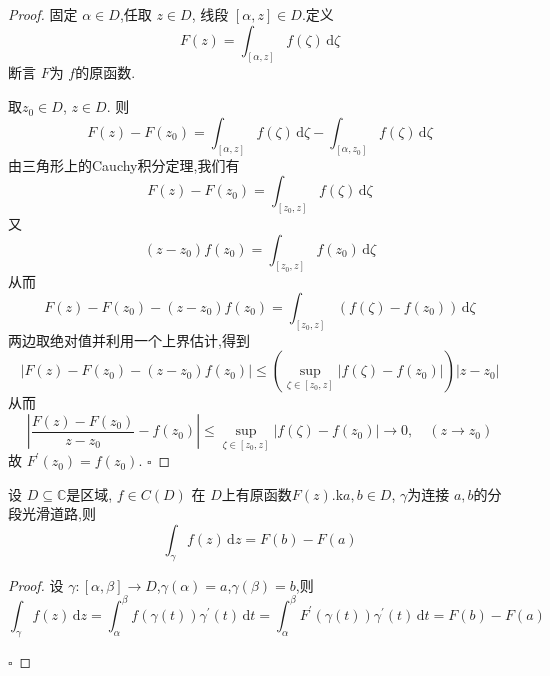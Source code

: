\documentclass[../../复变函数.tex]{subfiles}
\begin{document}
\begin{proof}
    固定 \(   \alpha  \in  D  \),任取 \(  z \in D  \), 线段 \(  \left[  \alpha ,z  \right] \in D   \).定义 \[
    F\left( z \right)= \int_{\left[  \alpha ,z \right] }f\left( \zeta  \right)  \,\mathrm{d} \zeta 
    \]   断言 \(  F  \)为 \(  f  \)的原函数.
    
    取\(  z_0 \in D  \), \(  z \in D  \). 则 \[
    F\left( z \right)-F\left( z_0 \right)=  \int_{\left[  \alpha ,z \right] }f\left( \zeta  \right)\,\mathrm{d} \zeta -\int_{\left[  \alpha ,z_0 \right] }f\left( \zeta  \right)\,\mathrm{d} \zeta     
    \]   
由三角形上的Cauchy积分定理,我们有 \[
F\left( z \right)-F\left( z_0 \right)= \int_{\left[ z_0,z \right] }f\left( \zeta  \right)\,\mathrm{d} \zeta    
\]又 \[
\left( z-z_0 \right)f\left( z_0 \right)= \int_{\left[ z_0,z \right] }f\left( z_0 \right)\,\mathrm{d} \zeta    
\]从而 \[
F\left( z \right)-F\left( z_0 \right)-\left( z-z_0 \right)f\left( z_0 \right)= \int_{\left[ z_0,z \right] }\left( f\left( \zeta  \right)-f\left( z_0 \right)   \right)\,\mathrm{d} \zeta     
\]两边取绝对值并利用一个上界估计,得到 \[
\left| F\left( z \right)-F\left( z_0 \right)  -\left( z-z_0 \right)f\left( z_0 \right)   \right|\le \left( \sup _{\zeta \in \left[ z_0,z \right] }\left| f\left( \zeta  \right)-f\left( z_0 \right)   \right|  \right)\left| z-z_0 \right|   
\]从而 \[
\left| \frac{F\left( z \right)-F\left( z_0 \right)   }{z-z_0 }-f\left( z_0 \right)   \right|\le  \sup _{\zeta \in \left[ z_0,z \right] }\left| f\left( \zeta  \right)-f\left( z_0 \right)   \right|\to 0,\quad \left( z\to z_0 \right)   
\]故 \(  F^{\prime} \left( z_0 \right)= f\left( z_0 \right)    \). 
    \hfill $\square$
\end{proof}

\begin{lemma}
    设 \(  D\subseteq \mathbb{C}   \)是区域, \(  f \in C\left( D \right)   \)  在 \(  D  \)上有原函数\(  F\left( z \right)   \).k\(  a,b \in D  \), \(   \gamma   \)为连接 \(  a,b  \)的分段光滑道路,则 \[
    \int_{ \gamma }f\left( z \right)\,\mathrm{d} z= F\left( b \right)-F\left( a \right)   
    \]     
\end{lemma}
\begin{proof}
    设 \(   \gamma :\left[  \alpha ,\beta  \right]\to D   \),\(   \gamma \left(  \alpha  \right)= a   \),\(   \gamma \left( \beta  \right)= b   \),则 \[
    \int_{ \gamma }f\left( z \right)\,\mathrm{d} z= \int_{ \alpha }^{ \beta }f\left(  \gamma \left( t \right)  \right) \gamma ^{\prime} \left( t \right)\,\mathrm{d} t= \int_{ \alpha }^{ \beta }F^{\prime} \left(  \gamma \left( t \right)  \right) \gamma ^{\prime} \left( t \right)     \,\mathrm{d} t= F\left( b \right)-F\left( a \right)  
    \]   

    \hfill $\square$
\end{proof}
\end{document}
